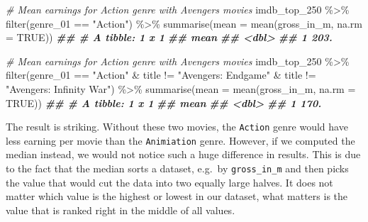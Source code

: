 \documentclass[
]{book}
\newenvironment{Shaded}{\begin{snugshade}}{\end{snugshade}}
\newcommand{\AttributeTok}[1]{\textcolor[rgb]{0.77,0.63,0.00}{#1}}
\newcommand{\CommentTok}[1]{\textcolor[rgb]{0.56,0.35,0.01}{\textit{#1}}}
\newcommand{\ConstantTok}[1]{\textcolor[rgb]{0.00,0.00,0.00}{#1}}
\newcommand{\DocumentationTok}[1]{\textcolor[rgb]{0.56,0.35,0.01}{\textbf{\textit{#1}}}}
\newcommand{\FunctionTok}[1]{\textcolor[rgb]{0.00,0.00,0.00}{#1}}
\newcommand{\NormalTok}[1]{#1}
\newcommand{\SpecialCharTok}[1]{\textcolor[rgb]{0.00,0.00,0.00}{#1}}
\newcommand{\StringTok}[1]{\textcolor[rgb]{0.31,0.60,0.02}{#1}}
\begin{document}
\begin{Shaded}
\begin{Highlighting}[]
\CommentTok{\# Mean earnings for Action genre with Avengers movies}
\NormalTok{imdb\_top\_250 }\SpecialCharTok{\%\textgreater{}\%} 
  \FunctionTok{filter}\NormalTok{(genre\_01 }\SpecialCharTok{==} \StringTok{"Action"}\NormalTok{) }\SpecialCharTok{\%\textgreater{}\%} 
  \FunctionTok{summarise}\NormalTok{(}\AttributeTok{mean =} \FunctionTok{mean}\NormalTok{(gross\_in\_m, }\AttributeTok{na.rm =} \ConstantTok{TRUE}\NormalTok{))}
\DocumentationTok{\#\# \# A tibble: 1 x 1}
\DocumentationTok{\#\#    mean}
\DocumentationTok{\#\#   \textless{}dbl\textgreater{}}
\DocumentationTok{\#\# 1  203.}

\CommentTok{\# Mean earnings for Action genre with Avengers movies}
\NormalTok{imdb\_top\_250 }\SpecialCharTok{\%\textgreater{}\%} 
  \FunctionTok{filter}\NormalTok{(genre\_01 }\SpecialCharTok{==} \StringTok{"Action"} \SpecialCharTok{\&}
\NormalTok{           title }\SpecialCharTok{!=} \StringTok{"Avengers: Endgame"} \SpecialCharTok{\&}
\NormalTok{           title }\SpecialCharTok{!=} \StringTok{"Avengers: Infinity War"}\NormalTok{) }\SpecialCharTok{\%\textgreater{}\%} 
  \FunctionTok{summarise}\NormalTok{(}\AttributeTok{mean =} \FunctionTok{mean}\NormalTok{(gross\_in\_m, }\AttributeTok{na.rm =} \ConstantTok{TRUE}\NormalTok{))}
\DocumentationTok{\#\# \# A tibble: 1 x 1}
\DocumentationTok{\#\#    mean}
\DocumentationTok{\#\#   \textless{}dbl\textgreater{}}
\DocumentationTok{\#\# 1  170.}
\end{Highlighting}
\end{Shaded}

The result is striking. Without these two movies, the \texttt{Action} genre would have less earning per movie than the \texttt{Animiation} genre. However, if we computed the median instead, we would not notice such a huge difference in results. This is due to the fact that the median sorts a dataset, e.g.~by \texttt{gross\_in\_m} and then picks the value that would cut the data into two equally large halves. It does not matter which value is the highest or lowest in our dataset, what matters is the value that is ranked right in the middle of all values.
\end{document}
